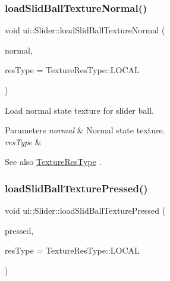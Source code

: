 \subsubsection{\texorpdfstring{load\+Slid\+Ball\+Texture\+Normal()}{loadSlidBallTextureNormal()}\hspace{0.1cm}{\footnotesize\ttfamily [2/2]}}
{\footnotesize\ttfamily void ui\+::\+Slider\+::load\+Slid\+Ball\+Texture\+Normal (\begin{DoxyParamCaption}\item[{const std\+::string \&}]{normal,  }\item[{\hyperlink{classui_1_1Widget_a040a65ec5ad3b11119b7e16b98bd9af0}{Texture\+Res\+Type}}]{res\+Type = {\ttfamily TextureResType\+:\+:LOCAL} }\end{DoxyParamCaption})}

Load normal state texture for slider ball.


\begin{DoxyParams}{Parameters}
{\em normal} & Normal state texture. \\
\hline
{\em res\+Type} & \\
\hline
\end{DoxyParams}
\begin{DoxySeeAlso}{See also}
\hyperlink{classui_1_1Widget_a040a65ec5ad3b11119b7e16b98bd9af0}{Texture\+Res\+Type} . 
\end{DoxySeeAlso}
\mbox{\label{classui_1_1Slider_a86cb93cd2b0c422864fcdad7a5484825}} 
\subsubsection{\texorpdfstring{load\+Slid\+Ball\+Texture\+Pressed()}{loadSlidBallTexturePressed()}\hspace{0.1cm}{\footnotesize\ttfamily [1/2]}}
{\footnotesize\ttfamily void ui\+::\+Slider\+::load\+Slid\+Ball\+Texture\+Pressed (\begin{DoxyParamCaption}\item[{const std\+::string \&}]{pressed,  }\item[{\hyperlink{classui_1_1Widget_a040a65ec5ad3b11119b7e16b98bd9af0}{Texture\+Res\+Type}}]{res\+Type = {\ttfamily TextureResType\+:\+:LOCAL} }\end{DoxyParamCaption})}

